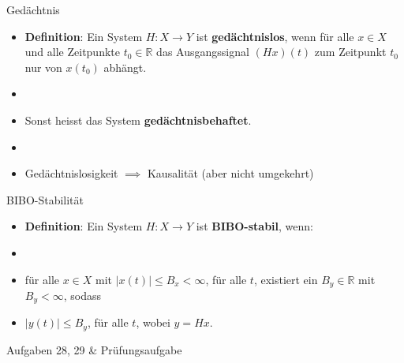 \documentclass[14pt, aspectratio=169, handout]{beamer}
\begin{document}
\begin{frame}{Gedächtnis}
    \begin{itemize}
        \item \textbf{Definition}: Ein System $H:X \to Y$ ist \textbf{gedächtnislos}, wenn für alle $x\in X$ und alle Zeitpunkte $t_0 \in \mathbb{R}$ das Ausgangssignal $(Hx)(t)$ zum Zeitpunkt $t_0$ nur von $x(t_0)$ abhängt.
        \item[] 
        \item Sonst heisst das System \textbf{gedächtnisbehaftet}.
        \item[] 
        \item Gedächtnislosigkeit $\implies$ Kausalität (aber nicht umgekehrt)
    \end{itemize}
\end{frame}

\begin{frame}{BIBO-Stabilität}
    \begin{itemize}
        \item \textbf{Definition}: Ein System $H:X\to Y$ ist \textbf{BIBO-stabil}, wenn: 
        \item[] 
        \item[] für alle $x\in X$ mit $|x(t)| \leq B_x < \infty$, für alle $t$, existiert ein $B_y \in \mathbb{R}$ mit $B_y < \infty$, sodass 
        \item[] \vspace{0.25cm} $|y(t)| \leq B_y$, für alle $t$, wobei $y=Hx$.

    \end{itemize}
\end{frame}

\begin{frame}{Aufgaben 28, 29 \& Prüfungsaufgabe}
    
\end{frame}
\end{document}
